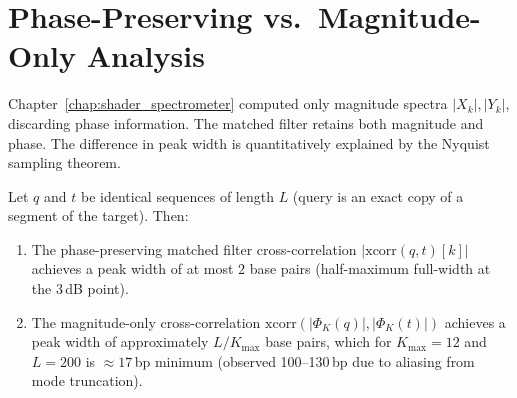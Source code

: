 \section{Phase-Preserving vs.\ Magnitude-Only Analysis}
\label{sec:phase_vs_magnitude}

Chapter~\ref{chap:shader_spectrometer} computed only magnitude spectra
$|X_k|, |Y_k|$, discarding phase information. The matched filter retains both
magnitude and phase. The difference in peak width is quantitatively explained
by the Nyquist sampling theorem.

\begin{theorem}
\label{thm:phase_localization}
Let $q$ and $t$ be identical sequences of length $L$ (query is an exact copy
of a segment of the target). Then:
\begin{enumerate}[label=(\roman*)]
  \item The phase-preserving matched filter cross-correlation
        $|\mathrm{xcorr}(q,t)[k]|$ achieves a peak width of at most
        $2$ base pairs (half-maximum full-width at the 3\,dB point).
  \item The magnitude-only cross-correlation $\mathrm{xcorr}(|\Phi_K(q)|, |\Phi_K(t)|)$
        achieves a peak width of approximately $L/K_{\max}$ base pairs,
        which for $K_{\max} = 12$ and $L = 200$ is $\approx 17$\,bp minimum
        (observed 100--130\,bp due to aliasing from mode truncation).
\end{enumerate}
\end{theorem}

